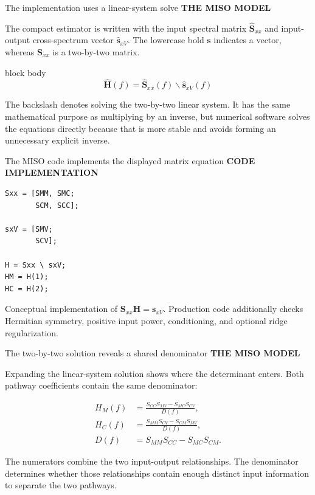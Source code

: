 \documentclass[aspectratio=169,11pt]{beamer}
\newcommand{\sectionlabel}[1]{%
  {\color{Accent}\fontsize{8}{9.5}\selectfont\bfseries\MakeUppercase{#1}}\par\vspace{0.12cm}}
\newcommand{\sourcefooter}[1]{%
  \par\vfill{\color{Muted}\fontsize{6.8}{8}\selectfont #1}}
\newenvironment{equationcallout}
  {\begin{beamercolorbox}[rounded=true,sep=0.28cm,center,wd=0.94\textwidth]{block body}%
   \setbeamercolor{block body}{bg=AccentLight,fg=Ink}\large}
  {\end{beamercolorbox}}
\begin{document}
\begin{frame}{The implementation uses a linear-system solve}
\sectionlabel{The MISO Model}
The compact estimator is written with the input spectral matrix
$\widehat{\mathbf S}_{xx}$ and input-output cross-spectrum vector
$\widehat{\mathbf s}_{xV}$. The lowercase bold $\mathbf s$ indicates a vector,
whereas $\mathbf S_{xx}$ is a two-by-two matrix.

\vspace{0.35cm}
\begin{equationcallout}
\[
\widehat{\mathbf H}(f)
=\widehat{\mathbf S}_{xx}(f)\backslash
 \widehat{\mathbf s}_{xV}(f)
\]
\end{equationcallout}

\vspace{0.25cm}
The backslash denotes solving the two-by-two linear system. It has the same
mathematical purpose as multiplying by an inverse, but numerical software solves
the equations directly because that is more stable and avoids forming an
unnecessary explicit inverse.
\end{frame}

\begin{frame}[fragile]{The MISO code implements the displayed matrix equation}
\sectionlabel{Code Implementation}
\begin{lstlisting}[style=matlabslide]
Sxx = [SMM, SMC;
       SCM, SCC];

sxV = [SMV;
       SCV];

H = Sxx \ sxV;
HM = H(1);
HC = H(2);
\end{lstlisting}
\sourcefooter{Conceptual implementation of $\mathbf S_{xx}\mathbf H=\mathbf s_{xV}$. Production code additionally checks Hermitian symmetry, positive input power, conditioning, and optional ridge regularization.}
\end{frame}

\begin{frame}{The two-by-two solution reveals a shared denominator}
\sectionlabel{The MISO Model}
Expanding the linear-system solution shows where the determinant enters. Both
pathway coefficients contain the same denominator:

\vspace{0.18cm}
\begin{align*}
H_M(f)&=
\frac{S_{CC}S_{MV}-S_{MC}S_{CV}}{D(f)},\\[0.18cm]
H_C(f)&=
\frac{S_{MM}S_{CV}-S_{CM}S_{MV}}{D(f)},\\[0.18cm]
D(f)&=S_{MM}S_{CC}-S_{MC}S_{CM}.
\end{align*}

The numerators combine the two input-output relationships. The denominator
determines whether those relationships contain enough distinct input
information to separate the two pathways.
\end{frame}
\end{document}
